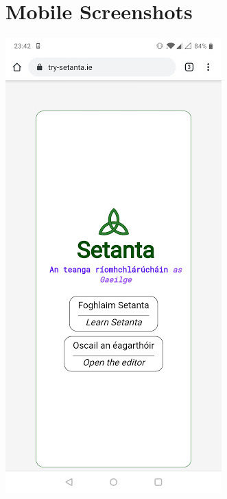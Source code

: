 \section{Mobile Screenshots}
\begin{minipage}[t]{0.45\textwidth}
    \begin{center}
        \includegraphics[scale=0.45]{app4assets/landing-mobile}
        \label{screenshot:landing-mobile}
    \end{center}
\end{minipage}
\hspace{0.5mm}
